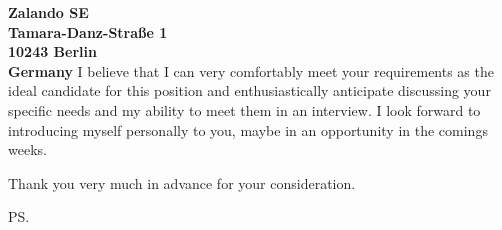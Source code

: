 \documentclass[a4paper]{joaosoares-letter}
\begin{document}
\begin{letter}{\bfseries Zalando SE\\Tamara-Danz-Straße 1\\10243 Berlin\\Germany}
I believe that I can very comfortably meet your requirements as the ideal candidate for this position and enthusiastically anticipate discussing your specific needs and my ability to meet them in an interview. I look forward to introducing myself personally to you, maybe in an opportunity in the comings weeks.

\closing{ Thank you very much in advance for your consideration.}
\vspace{20pt}
\ps

\vspace{\fill}

\end{letter}
\end{document}
